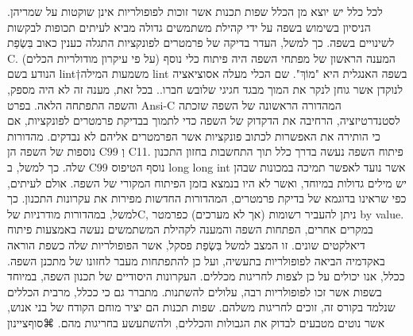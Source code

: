       לכל כלל יש יוצא מן הכלל
      שפות תכנות אשר זוכות לפופולריות אינן שוקטות על שמריהן. הניסיון בשימוש בשפה על ידי קהילת משתמשים גדולה מביא לעיתים תכופות לבקשות לשינויים בשפה. כך למשל, העדר בדיקה של פרמטרים לפונקציות התגלה כענין כאוב בִּשְׂפַת C. המענה הראשון של מפתחי השפה היה פיתוח כלי נוסף (על פי עיקרון מודולריות הכלים) הנודע בשם lint†{משמעות המילה lint בשפה האנגלית היא "מוֹךְ". שם הכלי מעלה אסוציאציה לנוקדן אשר גוחן לנקר את המוך מבגד חגיגי שלובש חברו.}. בכל זאת, מענה זה לא היה מספק, והשפה התפתחה הלאה. בפרט Ansi-C המהדורה הראשונה של השפה שזכתה לסטנדרטיזציה, הרחיבה את הדקדוק של השפה כדי לתמוך בבדיקת פרמטרים לפונקציות, אם כי הותירה את האפשרות לכתוב פונקציות אשר הפרמטרים אליהם לא נבדקים. מהדורות נוספות של השפה הן C99 וְ C11.
      פיתוח השפה נעשה בדרך כלל תוך התחשבות בחזון התכנון שלה. כך למשל, ב C99 נוסף הטיפוס
      long long int
      אשר נועד לאפשר תמיכה במכונות שבהן יש מילים גדולות במיוחד, ואשר לא היו בנמצא בזמן הפיתוח המקורי של השפה. אולם לעיתים, כפי שראינו בדוגמא של בדיקת פרמטרים, המהדורות החדשות מפירות את עקרונות התכנון. כך למשל, במהדורות מודרניות שלC, ניתן להעביר רשומות (אך לא מערכים) כפרמטר by value.
      במקרים אחרים, הפתחות השפה והמענה לקהילת המשתמשים נעשה באמצעות פיתוח דיאלקטים שונים. זו המצב למשל בִּשְׂפַת פסקל, אשר הפופולריות שלה כשפת הוראה באקדמיה הביאה לפופולריות בתעשיה, ועל כן להתפתחות מעבר לחזונו של מתכנן השפה.
      ככלל, אנו יכולים על כן לצפות לחריגות מכללים. העקרונות היסודיים של תכנון השפה, במיוחד בשפות אשר זכו לפופולריות רבה, עלולים להשתנות. מתברר גם כי ככלל, מרבית הכללים שנלמד בקורס זה, זוכים לחריגות משלהם. שפות תכנות הם יציר מוחם הקודח של בני אנוש, אשר נוטים מטבעים לבדוק את הגבולות והכללים, ולהשתעשע בחריגות מהם.
  ⌘סוף{ציינון}


